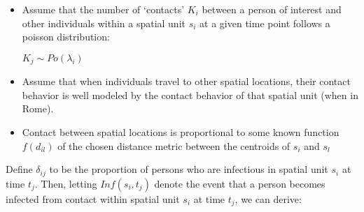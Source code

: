 \documentclass[12pt]{article}
\begin{document}
\begin{itemize}

    \item Assume that the number of `contacts' $K_i$ between a person of interest 
    and other individuals within a spatial unit $s_i$ at a given time point follows a poisson 
    distribution:\\
    \begin{center}
        $K_j \sim Po(\lambda_i)$
    \end{center}
    \item Assume that when individuals travel to other spatial locations, their 
        contact behavior is well modeled by the contact behavior of that spatial unit (when in Rome).  
    \item Contact between spatial locations is proportional to some known function $f(d_{il})$
        of the chosen distance metric between the centroids of $s_i$ and $s_l$
\end{itemize}

Define $\delta_{ij}$ to be the proportion of persons who are infectious in spatial unit $s_i$ 
at time $t_j$. Then, letting $Inf(s_i, t_j)$ denote the event that a person becomes 
infected from contact within spatial unit $s_i$ at time $t_j$, we can derive:
\end{document}
